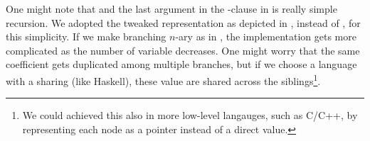 \documentclass[./rims-smooth-paper.tex]{subfiles}
\begin{document}
One might note that  and the last argument in the -clause in  is really simple recursion.
We adopted the tweaked representation as depicted in , instead of , for this simplicity.
If we make branching $n$-ary as in , the implementation gets more complicated as the number of variable decreases.
One might worry that the same coefficient gets duplicated among multiple branches, but if we choose a language with a sharing (like Haskell), these value are shared across the siblings\footnote{We could achieved this also in more low-level langauges, such as C/C++, by representing each node as a pointer instead of a direct value.}.
\end{document}
